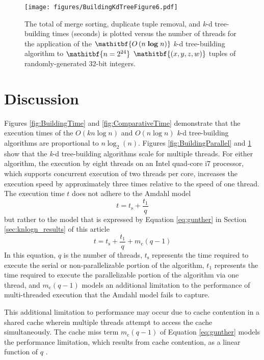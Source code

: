 \documentclass{sig-alternate}
\begin{document}
\begin{figure}[h]
\centering
\centerline{\texttt{[image: figures/BuildingKdTreeFigure6.pdf]}}
\caption{The total of merge sorting, duplicate tuple removal, and \emph{k}-d tree-building times (seconds) is plotted versus the number of threads for the application of the $\mathitbf{O\left(n \; \boldsymbol{\log} \; n\right)}$ \emph{k}-d tree-building algorithm to  $\mathitbf{n = 2^{24}}$ $\mathitbf{\left(x,y,z,w\right)}$ tuples of randomly-generated 32-bit integers.}
\label{fig:ComparativeParallel}
\end{figure}

\section{Discussion}
\label{sec:discussion}

Figures \ref{fig:BuildingTime} and \ref{fig:ComparativeTime} demonstrate that the execution times of the $O\left(kn \log n\right)$ and $O\left(n \log n\right)$ \emph{k}-d tree-building algorithms are proportional to $n \log_2 \left(n\right)$.  Figures \ref{fig:BuildingParallel} and \ref{fig:ComparativeParallel} show that the \emph{k}-d tree-building algorithms scale for multiple threads.  For either algorithm, the execution by eight threads on an Intel quad-core i7 processor, which supports concurrent execution of two threads per core, increases the execution speed by approximately three times relative to the speed of one thread.  The execution time $t$ does not adhere to the Amdahl \cite{Amdahl} model
\begin{equation}
t =  t_\mathrm{s} + \frac{t_1}{q}
\label{eq:amdahl}
\end{equation}
but rather to the model that is expressed by Equation \ref{eq:gunther} in Section \ref{sec:knlogn_results} of this article
\begin{equation*}
t =  t_\mathrm{s} + \frac{t_1}{q} + m_\mathrm{c}\left(q - 1\right)
\end{equation*}
In this equation, $q$ is the number of threads, $t_\mathrm{s}$ represents the time required to execute the serial or non-parallelizable portion of the algorithm, $t_1$ represents the time required to execute the parallelizable portion of the algorithm via one thread, and $m_\mathrm{c}\left(q - 1\right)$ models an additional limitation to the performance of multi-threaded execution that the Amdahl model fails to capture.

This additional limitation to performance may occur due to cache contention in a shared cache wherein multiple threads attempt to access the cache simultaneously.  The cache miss term $m_\mathrm{c}\left(q - 1\right)$ of Equation \ref{eq:gunther} models the performance limitation, which results from cache contention, as a linear function of $q$ \cite{Gunther}.
\end{document}
